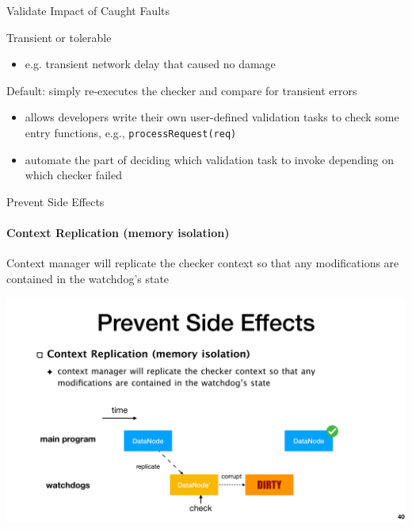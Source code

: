 \documentclass[aspectratio=169]{beamer}
\begin{document}
\begin{frame}{Validate Impact of Caught Faults}
    \begin{block}{Transient or tolerable}
        \begin{itemize}
            \item e.g. transient network delay that caused no damage
        \end{itemize}
    \end{block}

    \begin{block}{Default: simply re-executes the checker and compare for transient errors}
        \begin{itemize}
            \item  allows developers write their own user-defined validation tasks to check some entry functions, e.g., \texttt{processRequest(req)}
            \item automate the part of deciding which validation task to invoke depending on which checker failed
        \end{itemize}
    \end{block}

\end{frame}

\begin{frame}{Prevent Side Effects}
    \framesubtitle{Context Replication (memory isolation)}
    Context manager will replicate the checker context so that any modifications are contained in the watchdog’s state

    \begin{center}
        \includegraphics[width=.9\textwidth]{fig/replicate}
    \end{center}
\end{frame}
\end{document}
